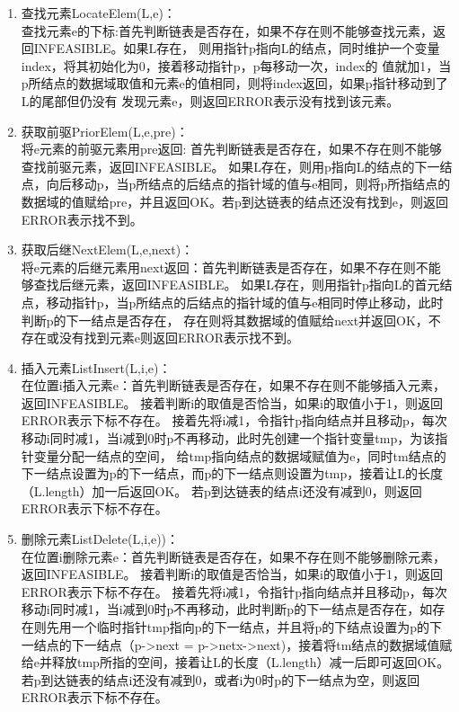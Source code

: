 \documentclass[supercite]{Experimental_Report}
\theoremstyle{definition}
\begin{document}
\begin{enumerate}
	\item 查找元素LocateElem(L,e)：\\查找元素e的下标:首先判断链表是否存在，如果不存在则不能够查找元素，返回INFEASIBLE。如果L存在，
	      则用指针p指向L的结点，同时维护一个变量index，将其初始化为0，接着移动指针p，p每移动一次，index的
	      值就加1，当p所结点的数据域取值和元素e的值相同，则将index返回，如果p指针移动到了L的尾部但仍没有
	      发现元素e，则返回ERROR表示没有找到该元素。

	\item 获取前驱PriorElem(L,e,pre)：\\将e元素的前驱元素用pre返回: 首先判断链表是否存在，如果不存在则不能够查找前驱元素，返回INFEASIBLE。
	      如果L存在，则用p指向L的结点的下一结点，向后移动p，当p所结点的后结点的指针域的值与e相同，则将p所指结点的数据域的值赋给pre，并且返回OK。若p到达链表的结点还没有找到e，则返回ERROR表示找不到。

	\item 获取后继NextElem(L,e,next)：\\将e元素的后继元素用next返回：首先判断链表是否存在，如果不存在则不能够查找后继元素，返回INFEASIBLE。
	      如果L存在，则用指针p指向L的首元结点，移动指针p，当p所结点的后结点的指针域的值与e相同时停止移动，此时判断p的下一结点是否存在，
	      存在则将其数据域的值赋给next并返回OK，不存在或没有找到元素e则返回ERROR表示找不到。

	\item 插入元素ListInsert(L,i,e)：\\在位置i插入元素e：首先判断链表是否存在，如果不存在则不能够插入元素，返回INFEASIBLE。
	      接着判断i的取值是否恰当，如果i的取值小于1，则返回ERROR表示下标不存在。
	      接着先将i减1，令指针p指向结点并且移动p，每次移动i同时减1，当i减到0时p不再移动，此时先创建一个指针变量tmp，为该指针变量分配一结点的空间，
	      给tmp指向结点的数据域赋值为e，同时tm结点的下一结点设置为p的下一结点，而p的下一结点则设置为tmp，接着让L的长度（L.length）加一后返回OK。
	      若p到达链表的结点i还没有减到0，则返回ERROR表示下标不存在。

	\item 删除元素ListDelete(L,i,e))：\\在位置i删除元素e：首先判断链表是否存在，如果不存在则不能够删除元素，返回INFEASIBLE。
	      接着判断i的取值是否恰当，如果i的取值小于1，则返回ERROR表示下标不存在。
	      接着先将i减1，令指针p指向结点并且移动p，每次移动i同时减1，当i减到0时p不再移动，此时判断p的下一结点是否存在，如存在则先用一个临时指针tmp指向p的下一结点，并且将p的下结点设置为p的下一结点的下一结点（p->next = p->netx->next)，接着将tm结点的数据域值赋给e并释放tmp所指的空间，接着让L的长度（L.length）减一后即可返回OK。
	      若p到达链表的结点i还没有减到0，或者i为0时p的下一结点为空，则返回ERROR表示下标不存在。


\end{enumerate}
\end{document}
